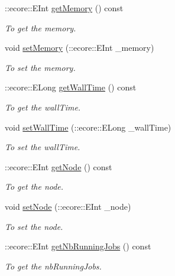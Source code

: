 \begin{DoxyCompactItemize}
::ecore::EInt \hyperlink{classTMS__Data_1_1Queue_a7489da2a2369982facb2fe50bdcf0caf}{getMemory} () const 
\begin{DoxyCompactList}\small\item\em To get the memory. \item\end{DoxyCompactList}\item 
void \hyperlink{classTMS__Data_1_1Queue_a80bd6c3dfb683b735f01bc53cdb89775}{setMemory} (::ecore::EInt \_\-memory)
\begin{DoxyCompactList}\small\item\em To set the memory. \item\end{DoxyCompactList}\item 
::ecore::ELong \hyperlink{classTMS__Data_1_1Queue_adedd7fb9b074a883af78706f97f4db40}{getWallTime} () const 
\begin{DoxyCompactList}\small\item\em To get the wallTime. \item\end{DoxyCompactList}\item 
void \hyperlink{classTMS__Data_1_1Queue_a938ccc33388b12553cd9ff6e8c9a683d}{setWallTime} (::ecore::ELong \_\-wallTime)
\begin{DoxyCompactList}\small\item\em To set the wallTime. \item\end{DoxyCompactList}\item 
::ecore::EInt \hyperlink{classTMS__Data_1_1Queue_aff42e426cdb127e1367e23ce41f87cf9}{getNode} () const 
\begin{DoxyCompactList}\small\item\em To get the node. \item\end{DoxyCompactList}\item 
void \hyperlink{classTMS__Data_1_1Queue_a350a0066b660e01c3617b4bbac236c72}{setNode} (::ecore::EInt \_\-node)
\begin{DoxyCompactList}\small\item\em To set the node. \item\end{DoxyCompactList}\item 
::ecore::EInt \hyperlink{classTMS__Data_1_1Queue_a781893d93cdb791c5f3b7ac0c9a50c30}{getNbRunningJobs} () const 
\begin{DoxyCompactList}\small\item\em To get the nbRunningJobs. \item\end{DoxyCompactList}\item 

\end{DoxyCompactItemize}
